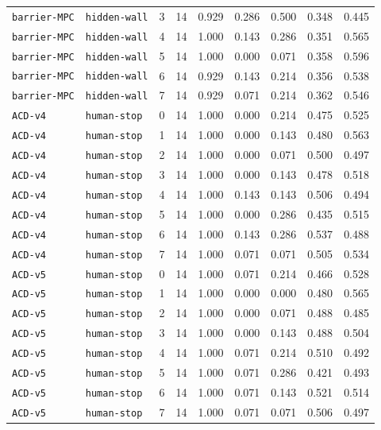 \documentclass{article}
\begin{document}
\begin{center}
{\begin{tabular}{llllccccc}
\texttt{barrier-MPC} & \texttt{hidden-wall} & 3 & 14 & 0.929 & 0.286 & 0.500 & 0.348 & 0.445 \\
\texttt{barrier-MPC} & \texttt{hidden-wall} & 4 & 14 & 1.000 & 0.143 & 0.286 & 0.351 & 0.565 \\
\texttt{barrier-MPC} & \texttt{hidden-wall} & 5 & 14 & 1.000 & 0.000 & 0.071 & 0.358 & 0.596 \\
\texttt{barrier-MPC} & \texttt{hidden-wall} & 6 & 14 & 0.929 & 0.143 & 0.214 & 0.356 & 0.538 \\
\texttt{barrier-MPC} & \texttt{hidden-wall} & 7 & 14 & 0.929 & 0.071 & 0.214 & 0.362 & 0.546 \\
\texttt{ACD-v4} & \texttt{human-stop} & 0 & 14 & 1.000 & 0.000 & 0.214 & 0.475 & 0.525 \\
\texttt{ACD-v4} & \texttt{human-stop} & 1 & 14 & 1.000 & 0.000 & 0.143 & 0.480 & 0.563 \\
\texttt{ACD-v4} & \texttt{human-stop} & 2 & 14 & 1.000 & 0.000 & 0.071 & 0.500 & 0.497 \\
\texttt{ACD-v4} & \texttt{human-stop} & 3 & 14 & 1.000 & 0.000 & 0.143 & 0.478 & 0.518 \\
\texttt{ACD-v4} & \texttt{human-stop} & 4 & 14 & 1.000 & 0.143 & 0.143 & 0.506 & 0.494 \\
\texttt{ACD-v4} & \texttt{human-stop} & 5 & 14 & 1.000 & 0.000 & 0.286 & 0.435 & 0.515 \\
\texttt{ACD-v4} & \texttt{human-stop} & 6 & 14 & 1.000 & 0.143 & 0.286 & 0.537 & 0.488 \\
\texttt{ACD-v4} & \texttt{human-stop} & 7 & 14 & 1.000 & 0.071 & 0.071 & 0.505 & 0.534 \\
\texttt{ACD-v5} & \texttt{human-stop} & 0 & 14 & 1.000 & 0.071 & 0.214 & 0.466 & 0.528 \\
\texttt{ACD-v5} & \texttt{human-stop} & 1 & 14 & 1.000 & 0.000 & 0.000 & 0.480 & 0.565 \\
\texttt{ACD-v5} & \texttt{human-stop} & 2 & 14 & 1.000 & 0.000 & 0.071 & 0.488 & 0.485 \\
\texttt{ACD-v5} & \texttt{human-stop} & 3 & 14 & 1.000 & 0.000 & 0.143 & 0.488 & 0.504 \\
\texttt{ACD-v5} & \texttt{human-stop} & 4 & 14 & 1.000 & 0.071 & 0.214 & 0.510 & 0.492 \\
\texttt{ACD-v5} & \texttt{human-stop} & 5 & 14 & 1.000 & 0.071 & 0.286 & 0.421 & 0.493 \\
\texttt{ACD-v5} & \texttt{human-stop} & 6 & 14 & 1.000 & 0.071 & 0.143 & 0.521 & 0.514 \\
\texttt{ACD-v5} & \texttt{human-stop} & 7 & 14 & 1.000 & 0.071 & 0.071 & 0.506 & 0.497 \\
\bottomrule
\end{tabular}%
}
\end{center}
\end{document}
